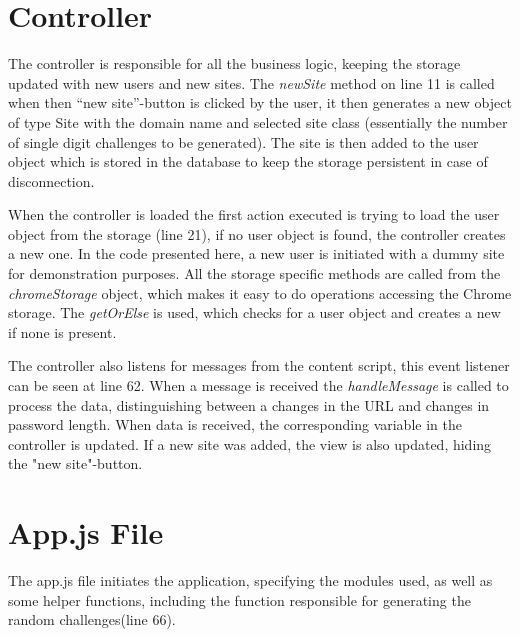 \section{Controller}\label{app:controller}

The controller is responsible for all the business logic, keeping the storage updated with new users and new sites. The \emph{newSite} method on line 11 is called when then ``new site''-button is clicked by the user, it then generates a new object of type Site with the domain name and selected site class (essentially the number of single digit challenges to be generated). The site is then added to the user object which is stored in the database to keep the storage persistent in case of disconnection. 
\par When the controller is loaded the first action executed is trying to load the user object from the storage (line 21), if no user object is found, the controller creates a new one. In the code presented here, a new user is initiated with a dummy site for demonstration purposes. All the storage specific methods are called from the \emph{chromeStorage} object, which makes it easy to do operations accessing the Chrome storage. The \emph{getOrElse} is used, which checks for a user object and creates a new if none is present. 
\par The controller also listens for messages from the content script, this event listener can be seen at line 62. When a message is received the \emph{handleMessage} is called to process the data, distinguishing between a changes in the URL and changes in password length. When data is received, the corresponding variable in the controller is updated. If a new site was added, the view is also updated, hiding the "new site"-button.

\section{App.js File}\label{app:app.js}


The app.js file initiates the application, specifying the modules used, as well as some helper functions, including the function responsible for generating the random challenges(line 66). 

